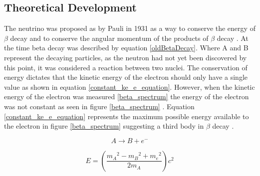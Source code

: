 \documentclass[12pt,a4paper]{article}
\begin{document}
\subsection{Theoretical Development}
The neutrino was proposed as by Pauli in 1931 as a way to conserve the energy of $\beta$ decay and to conserve the angular momentum of the products of $\beta$ decay \cite{griffiths2008introduction}\cite{lederman1970resource}. At the time beta decay was described by equation \ref{oldBetaDecay}. Where A and B represent the decaying particles, as the neutron had not yet been discovered by this point, it was considered a reaction between two nuclei. The conservation of energy dictates that the kinetic energy of the electron should only have a single value as shown in equation \ref{constant_ke_e_equation}. However, when the kinetic energy of the electron was measured \ref{beta_spectrum} the energy of the electron was not constant as seen in figure \ref{beta_spectrum} \cite{griffiths2008introduction} \cite{lewis1970neutrinos}. Equation \ref{constant_ke_e_equation} represents the maximum possible energy available to the electron in figure \ref{beta_spectrum} suggesting a third body in $\beta$ decay \cite{griffiths2008introduction}.


\begin{equation}
    A \rightarrow B + e^-
    \label{oldBetaDecay}
\end{equation}

\begin{equation}
    E = \left( \frac{{m_A}^2 - {m_B}^2 + {m_e}^2}{2m_A}\right) c^2
    \label{constant_ke_e_equation}
\end{equation}
\end{document}
